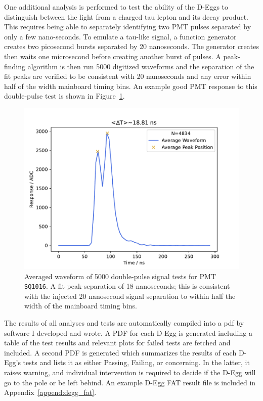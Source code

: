 \documentclass[main.tex]{subfiles}
\begin{document}
One additional analysis is performed to test the ability of the D-Eggs to distinguish between the light from a charged tau lepton and its decay product. 
This requires being able to separately identifying two PMT pulses separated by only a few nano-seconds. 
To emulate a tau-like signal, a function generator creates two picosecond bursts separated by 20 nanoseconds. 
The generator creates then waits one microsecond before creating another burst of pulses. 
A peak-finding algorithm is then run 5000 digitized waveforms and the separation of the fit peaks are verified to be consistent with 20 nanoseconds and any error within half of the width mainboard timing bins.
An example good PMT response to this double-pulse test is shown in Figure~\ref{fig:double_pulse}.

\begin{figure}
    \centering
    \includegraphics[width=0.8\linewidth]{figures/ave_wf_bl_sub_every_wf_DEgg2021-3-082_SQ1016.pdf}
    \caption{Averaged waveform of 5000 double-pulse signal tests for PMT \texttt{SQ1016}. A fit peak-separation of 18 nanoseconds; this is consistent with the injected 20 nanosecond signal separation to within half the width of the mainboard timing bins.}\label{fig:double_pulse}
\end{figure}

The results of all analyses and tests are automatically compiled into a pdf by software I developed and wrote.
A PDF for each D-Egg is generated including a table of the test results and relevant plots for failed tests are fetched and included. 
A second PDF is generated which summarizes the results of each D-Egg's tests and lists it as either Passing, Failing, or concerning. 
In the latter, it raises warning, and individual intervention is required to decide if the D-Egg will go to the pole or be left behind. 
An example D-Egg FAT result file is included in Appendix~\ref{append:degg_fat}.
\end{document}

